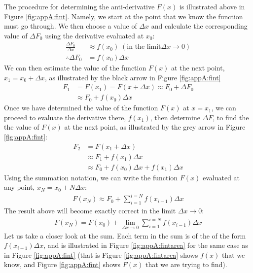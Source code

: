The procedure for determining the anti-derivative $F(x)$ is illustrated above in Figure \ref{fig:appA:fint}. Namely, we start at the point that we know the function must go through. We then choose a value of $\Delta x$ and calculate the corresponding value of $\Delta F_0$ using the derivative evaluated at $x_0$:
\begin{align*}
\frac{\Delta F_0}{\Delta x} &\approx f(x_0)\; (\text{in the limit} \Delta x\to 0 )\\
\therefore \Delta F_0 &= f(x_0) \Delta x
\end{align*}
We can then estimate the value of the function $F(x)$ at the next point, $x_1=x_0+\Delta x$, as illustrated by the black arrow in Figure \ref{fig:appA:fint} 
\begin{align*}
F_1&=F(x_1)=F(x+\Delta x) \approx F_0 + \Delta F_0\\
&\approx F_0+f(x_0)\Delta x
\end{align*}
Once we have determined the value of the function $F(x)$ at $x=x_1$, we can proceed to evaluate the derivative there, $f(x_1)$, then determine $\Delta F$, to find the the value of $F(x)$ at the next point, as illustrated by the grey arrow in Figure \ref{fig:appA:fint}:
\begin{align*}
F_2&=F(x_1+\Delta x) \\
&\approx F_1+f(x_1)\Delta x\\
&\approx F_0+f(x_0)\Delta x+f(x_1)\Delta x
\end{align*}
Using the summation notation, we can write the function $F(x)$ evaluated at any point, $x_N=x_0+N\Delta x$:
\begin{align*}
F(x_N) \approx F_0+\sum_{i=1}^{i=N} f(x_{i-1}) \Delta x
\end{align*}
The result above will become exactly correct in the limit $\Delta x\to 0$:
\begin{align}
\label{eqn:appA:intsum}
F(x_N) = F(x_0)+\lim_{\Delta x\to 0}\sum_{i=1}^{i=N} f(x_{i-1}) \Delta x
\end{align}
Let us take a closer look at the sum. Each term in the sum is of the of the form $f(x_{i-1})\Delta x$, and is illustrated in Figure \ref{fig:appA:fintarea} for the same case as in Figure \ref{fig:appA:fint} (that is Figure \ref{fig:appA:fintarea} shows $f(x)$ that we know, and Figure \ref{fig:appA:fint} shows $F(x)$ that we are trying to find).

